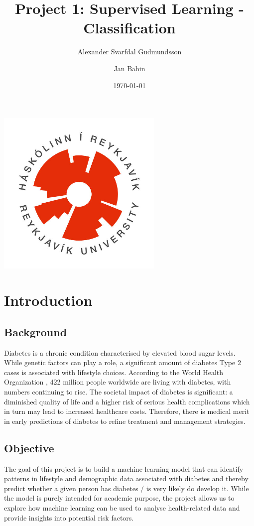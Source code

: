 \documentclass[a4paper,12pt]{article}
\title{Project 1: Supervised Learning - Classification}
\author{Alexander Svarfdal Gudmundsson \and Jan Babin}
\date{\today}
\begin{document}
\maketitle

\begin{center}  
    \includegraphics[width=0.6\textwidth]{HR_logo.jpg}
\end{center}

\clearpage

\tableofcontents

\clearpage

\section{Introduction}
\subsection{Background}
Diabetes is a chronic condition characterised by elevated blood sugar levels. While genetic factors 
can play a role, a significant amount of diabetes Type 2 cases is associated with lifestyle choices. 
According to the World Health Organization \cite{WHO2016}, 422 million people worldwide 
are living with diabetes, with numbers continuing to rise. The societal impact of diabetes is 
significant: a diminished quality of life and a higher risk of serious health complications which in 
turn may lead to increased healthcare costs. Therefore, there is medical merit in
early predictions of diabetes to refine treatment and management strategies.

\subsection{Objective}
The goal of this project is to build a machine learning model that can identify 
patterns in lifestyle and demographic data associated with diabetes and thereby predict whether
a given person has diabetes / is very likely do develop it. While the 
model is purely intended for academic purpose, the project allows us to 
explore how machine learning can be used to analyse health-related data and 
provide insights into potential risk factors.
\end{document}
